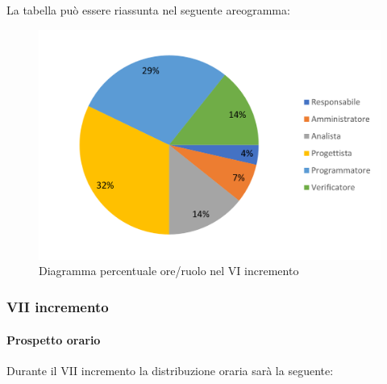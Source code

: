 La tabella può essere riassunta nel seguente areogramma:
\begin{figure}[H]
	\centering
	\includegraphics[width=0.8\linewidth]{res/images/preventivo/dettaglio_implementazione/3-2.png}
	\caption{Diagramma percentuale ore/ruolo nel VI incremento}
	\label{fig:diagramma costi ruolo VI incremento}
\end{figure}

\subsubsection{VII incremento}
\paragraph{Prospetto orario}
Durante il VII incremento la distribuzione oraria sarà la seguente:

